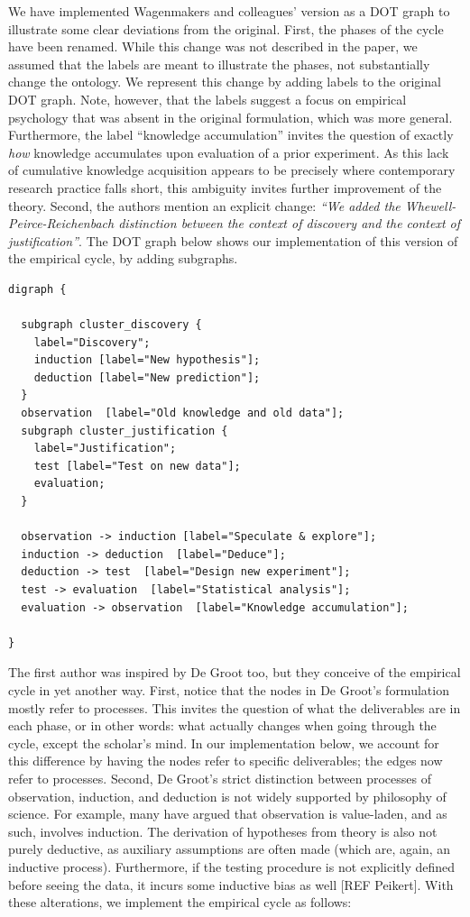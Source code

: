\documentclass[
  man,floatsintext]{apa6}
\begin{document}
We have implemented Wagenmakers and colleagues' version as a DOT graph
to illustrate some clear deviations from the original.
First, the phases of the cycle have been renamed.
While this change was not described in the paper,
we assumed that the labels are meant to illustrate the phases, not substantially change the ontology.
We represent this change by adding labels to the original DOT graph.
Note, however, that the labels suggest a focus on empirical psychology that was absent in the original formulation, which was more general.
Furthermore, the label ``knowledge accumulation'' invites the question of exactly \emph{how} knowledge accumulates upon evaluation of a prior experiment.
As this lack of cumulative knowledge acquisition appears to be precisely where contemporary research practice falls short, this ambiguity invites further improvement of the theory.
Second, the authors mention an explicit change: \emph{``We added the Whewell-Peirce-Reichenbach distinction between the context of discovery and the context of justification''}.
The DOT graph below shows our implementation of this version of the empirical cycle, by adding subgraphs.

\begin{verbatim}
digraph {

  subgraph cluster_discovery {
    label="Discovery";
    induction [label="New hypothesis"];
    deduction [label="New prediction"];
  }
  observation  [label="Old knowledge and old data"];
  subgraph cluster_justification {
    label="Justification";
    test [label="Test on new data"];
    evaluation;
  }

  observation -> induction [label="Speculate & explore"];
  induction -> deduction  [label="Deduce"];
  deduction -> test  [label="Design new experiment"];
  test -> evaluation  [label="Statistical analysis"];
  evaluation -> observation  [label="Knowledge accumulation"];

}
\end{verbatim}

The first author was inspired by De Groot too,
but they conceive of the empirical cycle in yet another way.
First, notice that the nodes in De Groot's formulation mostly refer to processes.
This invites the question of what the deliverables are in each phase, or in other words: what actually changes when going through the cycle, except the scholar's mind.
In our implementation below, we account for this difference by having the nodes refer to specific deliverables; the edges now refer to processes.
Second, De Groot's strict distinction between processes of observation, induction, and deduction is not widely supported by philosophy of science.
For example, many have argued that observation is value-laden, and as such, involves induction.
The derivation of hypotheses from theory is also not purely deductive,
as auxiliary assumptions are often made (which are, again, an inductive process).
Furthermore, if the testing procedure is not explicitly defined before seeing the data, it incurs some inductive bias as well {[}REF Peikert{]}.
With these alterations, we implement the empirical cycle as follows:
\end{document}
